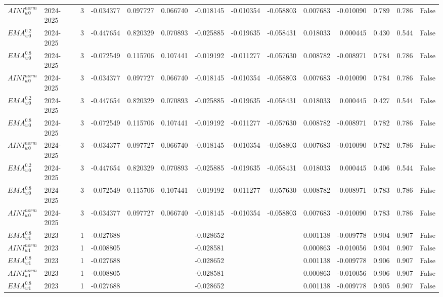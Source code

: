 \begin{tabular}{@{}llrrrrrrrrrlll@{}}
$AINI^{norm}_{w0}$ & 2024-2025 & 3 & -0.034377 & 0.097727 & 0.066740 & -0.018145 & -0.010354 & -0.058803 & 0.007683 & -0.010090 & 0.789 & 0.786 & False \\
$EMA^{0.2}_{w0}$ & 2024-2025 & 3 & -0.447654 & 0.820329 & 0.070893 & -0.025885 & -0.019635 & -0.058431 & 0.018033 & 0.000445 & 0.430 & 0.544 & False \\
$EMA^{0.8}_{w0}$ & 2024-2025 & 3 & -0.072549 & 0.115706 & 0.107441 & -0.019192 & -0.011277 & -0.057630 & 0.008782 & -0.008971 & 0.784 & 0.786 & False \\
$AINI^{norm}_{w0}$ & 2024-2025 & 3 & -0.034377 & 0.097727 & 0.066740 & -0.018145 & -0.010354 & -0.058803 & 0.007683 & -0.010090 & 0.784 & 0.786 & False \\
$EMA^{0.2}_{w0}$ & 2024-2025 & 3 & -0.447654 & 0.820329 & 0.070893 & -0.025885 & -0.019635 & -0.058431 & 0.018033 & 0.000445 & 0.427 & 0.544 & False \\
$EMA^{0.8}_{w0}$ & 2024-2025 & 3 & -0.072549 & 0.115706 & 0.107441 & -0.019192 & -0.011277 & -0.057630 & 0.008782 & -0.008971 & 0.782 & 0.786 & False \\
$AINI^{norm}_{w0}$ & 2024-2025 & 3 & -0.034377 & 0.097727 & 0.066740 & -0.018145 & -0.010354 & -0.058803 & 0.007683 & -0.010090 & 0.782 & 0.786 & False \\
$EMA^{0.2}_{w0}$ & 2024-2025 & 3 & -0.447654 & 0.820329 & 0.070893 & -0.025885 & -0.019635 & -0.058431 & 0.018033 & 0.000445 & 0.406 & 0.544 & False \\
$EMA^{0.8}_{w0}$ & 2024-2025 & 3 & -0.072549 & 0.115706 & 0.107441 & -0.019192 & -0.011277 & -0.057630 & 0.008782 & -0.008971 & 0.783 & 0.786 & False \\
$AINI^{norm}_{w0}$ & 2024-2025 & 3 & -0.034377 & 0.097727 & 0.066740 & -0.018145 & -0.010354 & -0.058803 & 0.007683 & -0.010090 & 0.783 & 0.786 & False \\
$EMA^{0.8}_{w1}$ & 2023 & 1 & -0.027688 &  &  & -0.028652 &  &  & 0.001138 & -0.009778 & 0.904 & 0.907 & False \\
$AINI^{norm}_{w1}$ & 2023 & 1 & -0.008805 &  &  & -0.028581 &  &  & 0.000863 & -0.010056 & 0.904 & 0.907 & False \\
$EMA^{0.8}_{w1}$ & 2023 & 1 & -0.027688 &  &  & -0.028652 &  &  & 0.001138 & -0.009778 & 0.906 & 0.907 & False \\
$AINI^{norm}_{w1}$ & 2023 & 1 & -0.008805 &  &  & -0.028581 &  &  & 0.000863 & -0.010056 & 0.906 & 0.907 & False \\
$EMA^{0.8}_{w1}$ & 2023 & 1 & -0.027688 &  &  & -0.028652 &  &  & 0.001138 & -0.009778 & 0.905 & 0.907 & False \\

\end{tabular}
